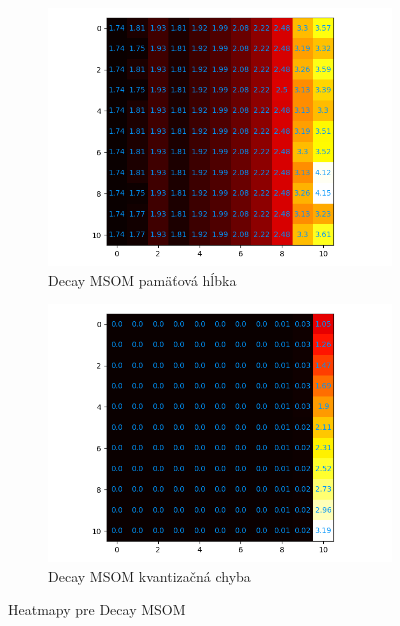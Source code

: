 \begin{figure}[H]
    \centering
    \begin{subfigure}{.5\textwidth}
        \centering
        \includegraphics[width=\linewidth]{assets/decay_msom_memory_span}
        \caption{Decay MSOM pamäťová hĺbka}
        \label{fig:sub1}
    \end{subfigure}%
    \begin{subfigure}{.5\textwidth}
        \centering
        \includegraphics[width=\linewidth]{assets/decay_msom_quantization_errors}
        \caption{Decay MSOM kvantizačná chyba}
        \label{fig:sub2}
    \end{subfigure}
    \caption{Heatmapy pre Decay MSOM}
    \label{fig:test}
\end{figure}
    
